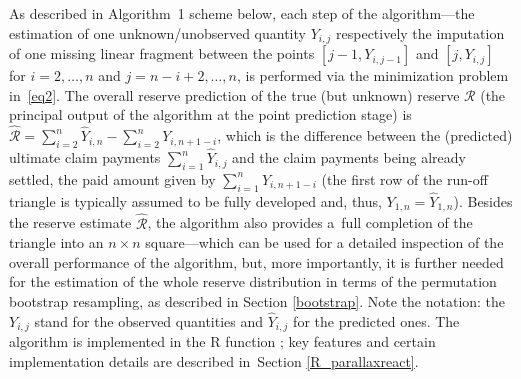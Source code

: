 As described in Algorithm~1 scheme below, each step of the algorithm---the estimation of one unknown/unobserved quantity $Y_{i,j}$ respectively the imputation of one missing linear fragment between the points $[j - 1, Y_{i, j - 1}]$ and $[j, Y_{i,j}]$ for $i = 2, \dots, n$ and $j = n - i + 2, \dots, n$, is performed via the minimization problem in~\eqref{eq2}. The overall reserve prediction  of the true (but unknown) reserve $\mathcal{R}$ (the principal output of the algorithm at the point prediction stage) is 
$\widehat{\mathcal{R}} = \sum_{i = 2}^n \widehat{Y}_{i,n} - \sum_{i = 2}^n Y_{i, n + 1 - i}$, 
which is the difference between the (predicted) ultimate claim payments $\sum_{i = 1}^n \widehat{Y}_{i,j}$ and the claim payments being already settled, the paid amount given by $\sum_{i = 1}^n Y_{i,n + 1 - i}$ (the first row of the run-off triangle is typically assumed to be fully developed and, thus, $Y_{1, n} = \widehat{Y}_{1, n}$).  Besides the reserve estimate $\widehat{\mathcal{R}}$, the algorithm also provides a~full completion of the triangle into an $n \times n$ square---which can be used for a detailed inspection of the overall performance of the algorithm, but, more importantly, it is further needed for the estimation of the whole reserve distribution in terms of the permutation bootstrap resampling, as described in Section \ref{bootstrap}. Note the notation: the $Y_{i,j}$ stand for the observed quantities and $\widehat{Y}_{i,j}$ for the predicted ones.
The algorithm is implemented in the R  function ; key features and certain implementation details are described in~Section \ref{R_parallaxreact}.

